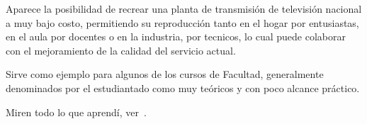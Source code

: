 Aparece la posibilidad de recrear una planta de transmisión de televisión nacional a muy bajo costo, permitiendo su reproducción tanto en el hogar por entusiastas, en el aula por docentes o en la industria, por tecnicos, lo cual puede colaborar con el mejoramiento de la calidad del servicio actual.
	
Sirve como ejemplo para algunos de los cursos de Facultad, generalmente denominados por el estudiantado como muy teóricos y con poco alcance práctico. 


Miren todo lo que aprendí, ver~\cite{Autor}.


